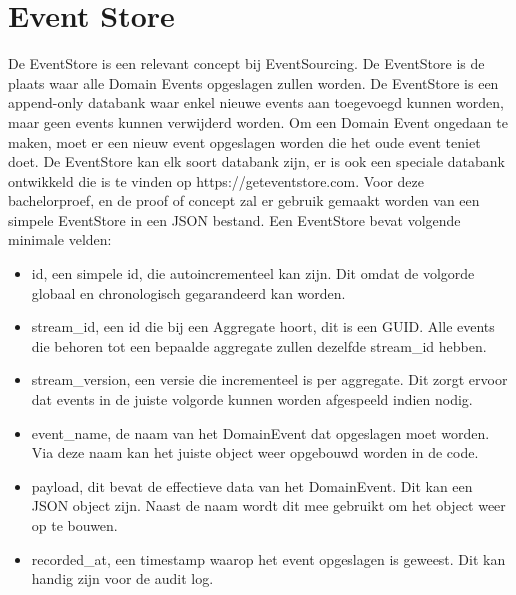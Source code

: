 
\section{Event Store}
\label{sec:event-store}

De EventStore is een relevant concept bij EventSourcing. De EventStore is de plaats waar alle Domain Events opgeslagen zullen worden. De EventStore is een append-only databank waar enkel nieuwe events aan toegevoegd kunnen worden, maar geen events kunnen verwijderd worden. Om een Domain Event ongedaan te maken, moet er een nieuw event opgeslagen worden die het oude event teniet doet. De EventStore kan elk soort databank zijn, er is ook een speciale databank ontwikkeld die is te vinden op https://geteventstore.com. Voor deze bachelorproef, en de proof of concept zal er gebruik gemaakt worden van een simpele EventStore in een \gls{JSON} bestand. Een EventStore bevat volgende minimale velden:

\begin{itemize}
  \item{id, een simpele id, die autoincrementeel kan zijn. Dit omdat de volgorde globaal en chronologisch gegarandeerd kan worden.}
  \item{stream_id, een id die bij een Aggregate hoort, dit is een \gls{GUID}. Alle events die behoren tot een bepaalde aggregate zullen dezelfde stream_id hebben.}
  \item{stream_version, een versie die incrementeel is per aggregate. Dit zorgt ervoor dat events in de juiste volgorde kunnen worden afgespeeld indien nodig.}
  \item{event_name, de naam van het DomainEvent dat opgeslagen moet worden. Via deze naam kan het juiste object weer opgebouwd worden in de code.}
  \item{payload, dit bevat de effectieve data van het DomainEvent. Dit kan een \gls{JSON} object zijn. Naast de naam wordt dit mee gebruikt om het object weer op te bouwen.}
  \item{recorded_at, een timestamp waarop het event opgeslagen is geweest. Dit kan handig zijn voor de audit log.}
\end{itemize}
